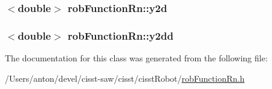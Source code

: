 \subsubsection[{y2d}]{$<$double$>$ rob\+Function\+Rn\+::y2d\hspace{0.3cm}{\ttfamily [protected]}}\label{classrob_function_rn_a99d86533626d78aa644816936ec01ac2}
\hypertarget{classrob_function_rn_af67e2c772c0550231dd2b768adbae702}{}
\subsubsection[{y2dd}]{$<$double$>$ rob\+Function\+Rn\+::y2dd\hspace{0.3cm}{\ttfamily [protected]}}\label{classrob_function_rn_af67e2c772c0550231dd2b768adbae702}


The documentation for this class was generated from the following file\+:\begin{DoxyCompactItemize}
\item 
/\+Users/anton/devel/cisst-\/saw/cisst/cisst\+Robot/\hyperlink{rob_function_rn_8h}{rob\+Function\+Rn.\+h}\end{DoxyCompactItemize}
